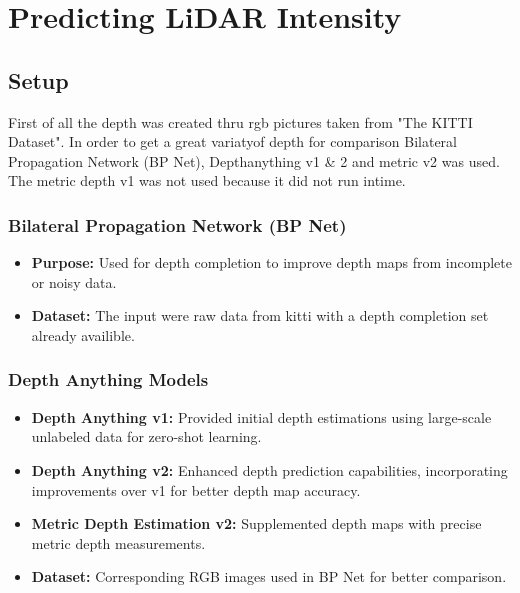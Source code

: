 \chapter{Predicting LiDAR Intensity} %
\section{Setup}
First of all the depth was created thru rgb pictures taken from "The KITTI Dataset". In order to get a great variatyof depth for comparison Bilateral Propagation Network (BP Net), Depthanything v1 \& 2 and metric v2 was used. The metric depth v1 was not used because it did not run intime.
\subsection{Bilateral Propagation Network (BP Net)}
\begin{itemize}
	\item \textbf{Purpose:} Used for depth completion to improve depth maps from incomplete or noisy data.
	\item \textbf{Dataset:} The input were raw data from kitti with a depth completion set already availible. 
\end{itemize}

\subsection{Depth Anything Models}
\begin{itemize}
	\item \textbf{Depth Anything v1:} Provided initial depth estimations using large-scale unlabeled data for zero-shot learning.
	\item \textbf{Depth Anything v2:} Enhanced depth prediction capabilities, incorporating improvements over v1 for better depth map accuracy.


 	\item \textbf {Metric Depth Estimation v2:} Supplemented depth maps with precise metric depth measurements.

	\item \textbf{Dataset:} Corresponding RGB images used in BP Net for better comparison.
\end{itemize}

